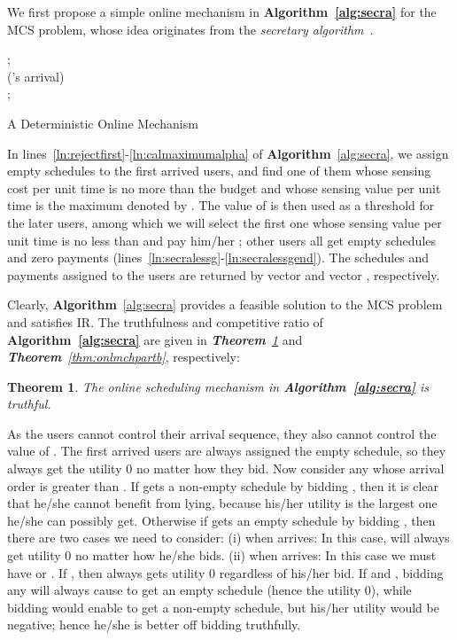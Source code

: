 \documentclass[10pt,journal,compsoc]{IEEEtran}
\newtheorem{theorem}{\textbf{Theorem}}
\begin{document}
  We first propose a simple online mechanism in \textbf{Algorithm~\ref{alg:secra}} for the MCS problem, whose idea originates from the \textit{secretary algorithm}~\cite{Dynkin1963}.
\begin{algorithm}[htb]
    ;~~~ \\
    \Upon('s arrival){
\\
        \eIf{}{
            ;~~~ \\ \label{ln:rejectfirst}
            \lIf{}{
                 \label{ln:calmaximumalpha}
}
        }
        {
            {
                ;~~~ \label{ln:secralessgend}
            }
        }
    }
    \Return{}
    \caption{A Deterministic Online Mechanism} \label{alg:secra}
  \end{algorithm}
In lines~\ref{ln:rejectfirst}-\ref{ln:calmaximumalpha} of \textbf{Algorithm}~\ref{alg:secra}, we assign empty schedules to the first arrived  users, and find one of them whose sensing cost per unit time is no more than the budget and whose sensing value per unit time is the maximum denoted by . The value of  is then used as a threshold for the later users, among which we will select the first one whose sensing value per unit time is no less than  and pay him/her ; other users all get empty schedules and zero payments (lines~\ref{ln:secralessg}-\ref{ln:secralessgend}). The schedules and payments assigned to the users are returned by vector  and vector , respectively.

  Clearly, \textbf{Algorithm}~\ref{alg:secra} provides a feasible solution to the MCS problem and satisfies IR. The truthfulness and competitive ratio of \textbf{Algorithm~\ref{alg:secra}} are given in \textit{\textbf{Theorem}~\ref{thm:secrtruthful}} and \textit{\textbf{Theorem}~\ref{thm:onlmchpartb}}, respectively:
\begin{theorem}
    The online scheduling mechanism in \textbf{Algorithm~\ref{alg:secra}} is truthful.
    \label{thm:secrtruthful}
  \end{theorem}
\begin{IEEEproof}
    As the users cannot control their arrival sequence, they also cannot control the value of . The first arrived  users are always assigned the empty schedule, so they always get the utility 0 no matter how they bid. Now consider any  whose arrival order is greater than . If  gets a non-empty schedule by bidding , then it is clear that he/she cannot benefit from lying, because his/her utility  is the largest one he/she can possibly get. Otherwise if  gets an empty schedule by bidding , then there are two cases we need to consider: (i)  when  arrives: In this case,  will always get utility 0 no matter how he/she bids. (ii)  when  arrives: In this case we must have  or . If , then  always gets utility 0 regardless of his/her bid. If  and , bidding any  will always cause  to get an empty schedule (hence the utility 0), while bidding  would enable  to get a non-empty schedule, but his/her utility  would be negative; hence he/she is better off bidding truthfully.
\end{IEEEproof}
\end{document}
